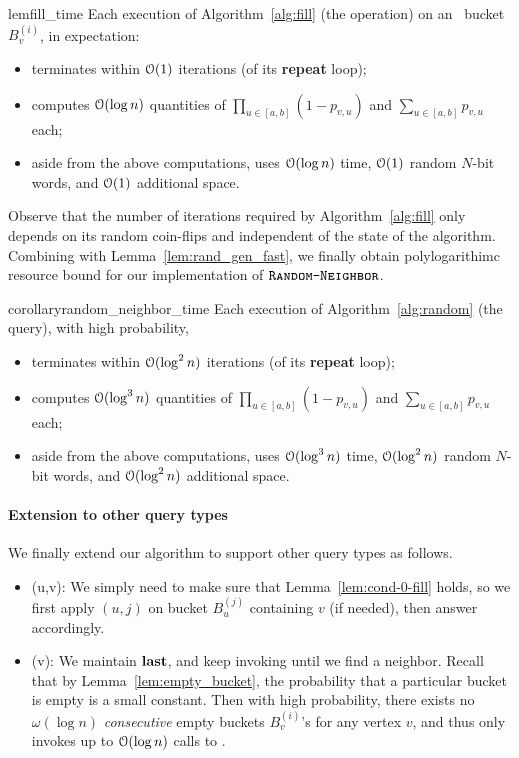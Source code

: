 \begin{restatable}{lem}{fill_time}
\label{lem:fill_time}
Each execution of Algorithm~\ref{alg:fill} (the  operation) on an \unfilled~bucket $B_v^{(i)}$, in expectation:
\begin{itemize}
\item terminates within $\mathcal{O}(1)$ iterations (of its \textup{\textbf{repeat}} loop);
\item computes $\mathcal{O}(\log n)$ quantities of $\prod_{u \in [a,b]} (1-p_{v,u})$ and $\sum_{u\in[a,b]} p_{v,u}$ each;
\item aside from the above computations, uses $\mathcal{O}(\log n)$ time, $\mathcal{O}(1)$ random $N$-bit words, and $\mathcal{O}(1)$ additional space.
\end{itemize}
\end{restatable}

Observe that the number of iterations required by Algorithm~\ref{alg:fill} only depends on its random coin-flips and independent of the state of the algorithm.
Combining with Lemma~\ref{lem:rand_gen_fast}, we finally obtain polylogarithimc resource bound for our implementation of $\texttt{\textsc{Random-Neighbor}}$.

\begin{restatable}{corollary}{random_neighbor_time}
\label{cor:random_neighbor_time}
Each execution of Algorithm~\ref{alg:random} (the  query), with high probability,
\begin{itemize}
\item terminates within $\mathcal{O}(\log^2 n)$ iterations (of its \textup{\textbf{repeat}} loop);
\item computes $\mathcal{O}(\log^3 n)$ quantities of $\prod_{u \in [a,b]} (1-p_{v,u})$ and $\sum_{u\in[a,b]} p_{v,u}$ each;
\item aside from the above computations, uses $\mathcal{O}(\log^3 n)$ time, $\mathcal{O}(\log^2 n)$ random $N$-bit words, and $\mathcal{O}(\log^2 n)$ additional space.
\end{itemize}
\end{restatable}

\paragraph*{Extension to other query types}
We finally extend our algorithm to support other query types as follows.
\begin{itemize}
\item {}(u,v): We simply need to make sure that Lemma~\ref{lem:cond-0-fill} holds, so we first apply $(u,j)$ on bucket $B_u^{(j)}$ containing $v$ (if needed), then answer accordingly.
\item {}(v): We maintain $\mathbf{last}$, and keep invoking  until we find a neighbor. Recall that by Lemma~\ref{lem:empty_bucket}, the probability that a particular bucket is empty is a small constant. Then with high probability, there exists no $\omega(\log n)$ \emph{consecutive} empty buckets $B_v^{(i)}$'s for any vertex $v$, and thus  only invokes up to $\mathcal{O}(\log n)$ calls to .
\end{itemize}

